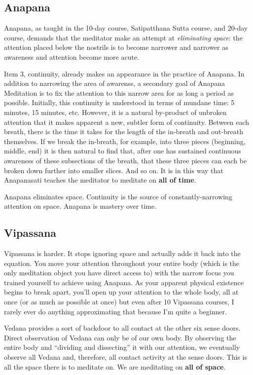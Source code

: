 \documentclass[a4paper, amsfonts, amssymb, amsmath, reprint, showkeys, nofootinbib, twoside]{revtex4-1}
\begin{document}
\subsection{Anapana}

Anapana, as taught in the 10-day course, Satipatthana Sutta course, and 20-day
course, demands that the meditator make an attempt at \textit{eliminating space}: the
attention placed below the nostrils is to become narrower and narrower as awareness
and attention become more acute.

Item 3, continuity, already makes an appearance in the practice of Anapana. In
addition to narrowing the area of awarenss, a secondary goal of Anapana Meditation is
to fix the attention to this narrow area for as long a period as possible. Initially,
this continuity is understood in terms of mundane time: 5 minutes, 15 minutes,
etc. However, it is a natural by-product of unbroken attention that it makes apparent
a new, subtler form of continuity. Between each breath, there is the time it takes
for the length of the in-breath and out-breath themselves. If we break the in-breath,
for example, into three pieces (beginning, middle, end) it is then natural to find
that, after one has sustained continuous awareness of these subsections of the
breath, that these three pieces can each be broken down further into smaller
slices. And so on. It is in
this way that Anapanasati teaches the meditator to meditate on \textbf{all of time}.


Anapana eliminates space. Continuity is the source of constantly-narrowing attention
on space. Anapana is mastery over time.

\subsection{Vipassana}

Vipassana is harder. It stops ignoring space and actually adds it back into the
equation. You move your attention throughout your entire body (which is the only
meditation object you have direct access to) with the narrow focus you trained
yourself to achieve using Anapana. As your apparent physical
existence begins to break apart, you’ll open up your attention to the whole body, all
at once (or as much as possible at once) but even after 10 Vipassana courses, I rarely
ever do anything approximating that because I’m quite a beginner. 🙂

Vedana provides a sort of backdoor to all contact at the other six sense
doors. Direct observation of Vedana can only be of our own body. By observing the
entire body and ``dividing and dissecting'' it with our attention, we eventually
observe all Vedana and, therefore, all contact activity at the sense doors. This is
all the space there is to meditate on. We are meditating on \textbf{all of space}.
\end{document}
